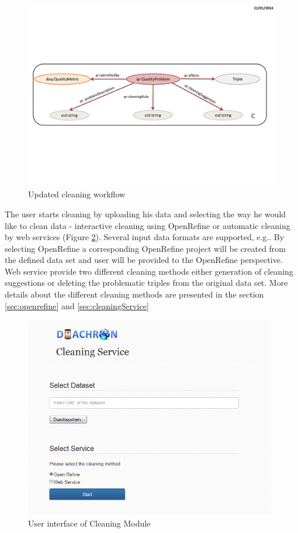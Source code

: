 \begin{figure}[ht!]
\centering
\includegraphics[page=6,trim=0.5cm 0.5cm 0.5cm 0.5cm,clip,width=\textwidth]{figures/CleaningFigures.pdf}
\caption{Updated cleaning workflow}
\label{fig:workflow}
\end{figure}

The user starts cleaning by uploading his data and selecting the way he would like to clean data - interactive cleaning using OpenRefine or automatic cleaning by web services (Figure \ref{fig:entry}).
Several input data formats are supported, e.g..
By selecting OpenRefine a corresponding OpenRefine project will be created from the defined data set and user will be provided to the OpenRefine perspective.
Web service provide two different cleaning methods either generation of cleaning suggestions or deleting the problematic triples from the original data set.
More details about the different cleaning methods are presented in the section \ref{sec:openrefine} and \ref{sec:cleaningService}


\begin{figure}[ht!]
\centering
\includegraphics[width=11cm]{figures/CleaningStartPage.PNG}
\caption{User interface of Cleaning Module}
\label{fig:entry}
\end{figure}


